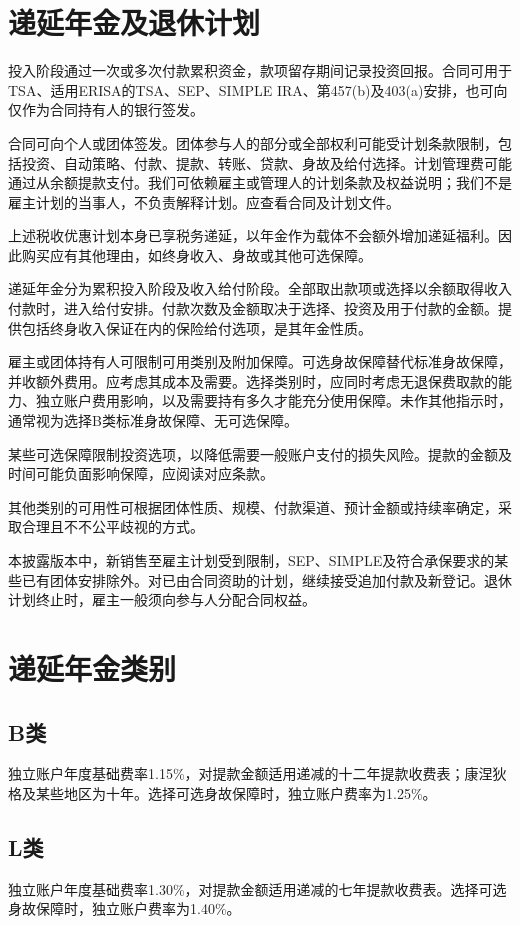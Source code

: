 \documentclass[UTF8,fontset=none,11pt,a4paper]{ctexart}
\begin{document}
\section*{递延年金及退休计划}
投入阶段通过一次或多次付款累积资金，款项留存期间记录投资回报。合同可用于TSA、适用ERISA的TSA、SEP、SIMPLE IRA、第457(b)及403(a)安排，也可向仅作为合同持有人的银行签发。


合同可向个人或团体签发。团体参与人的部分或全部权利可能受计划条款限制，包括投资、自动策略、付款、提款、转账、贷款、身故及给付选择。计划管理费可能通过从余额提款支付。我们可依赖雇主或管理人的计划条款及权益说明；我们不是雇主计划的当事人，不负责解释计划。应查看合同及计划文件。


上述税收优惠计划本身已享税务递延，以年金作为载体不会额外增加递延福利。因此购买应有其他理由，如终身收入、身故或其他可选保障。


递延年金分为累积投入阶段及收入给付阶段。全部取出款项或选择以余额取得收入付款时，进入给付安排。付款次数及金额取决于选择、投资及用于付款的金额。提供包括终身收入保证在内的保险给付选项，是其年金性质。


雇主或团体持有人可限制可用类别及附加保障。可选身故保障替代标准身故保障，并收额外费用。应考虑其成本及需要。选择类别时，应同时考虑无退保费取款的能力、独立账户费用影响，以及需要持有多久才能充分使用保障。未作其他指示时，通常视为选择B类标准身故保障、无可选保障。


某些可选保障限制投资选项，以降低需要一般账户支付的损失风险。提款的金额及时间可能负面影响保障，应阅读对应条款。


其他类别的可用性可根据团体性质、规模、付款渠道、预计金额或持续率确定，采取合理且不不公平歧视的方式。


本披露版本中，新销售至雇主计划受到限制，SEP、SIMPLE及符合承保要求的某些已有团体安排除外。对已由合同资助的计划，继续接受追加付款及新登记。退休计划终止时，雇主一般须向参与人分配合同权益。


\section*{递延年金类别}
\subsection*{B类}
独立账户年度基础费率1.15\%，对提款金额适用递减的十二年提款收费表；康涅狄格及某些地区为十年。选择可选身故保障时，独立账户费率为1.25\%。


\subsection*{L类}
独立账户年度基础费率1.30\%，对提款金额适用递减的七年提款收费表。选择可选身故保障时，独立账户费率为1.40\%。
\end{document}

